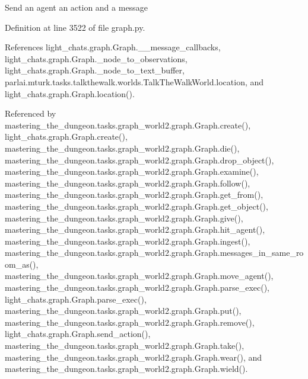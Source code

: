 \begin{DoxyVerb}Send an agent an action and a message\end{DoxyVerb}
 

Definition at line 3522 of file graph.\+py.



References light\+\_\+chats.\+graph.\+Graph.\+\_\+\+\_\+message\+\_\+callbacks, light\+\_\+chats.\+graph.\+Graph.\+\_\+node\+\_\+to\+\_\+observations, light\+\_\+chats.\+graph.\+Graph.\+\_\+node\+\_\+to\+\_\+text\+\_\+buffer, parlai.\+mturk.\+tasks.\+talkthewalk.\+worlds.\+Talk\+The\+Walk\+World.\+location, and light\+\_\+chats.\+graph.\+Graph.\+location().



Referenced by mastering\+\_\+the\+\_\+dungeon.\+tasks.\+graph\+\_\+world2.\+graph.\+Graph.\+create(), light\+\_\+chats.\+graph.\+Graph.\+create(), mastering\+\_\+the\+\_\+dungeon.\+tasks.\+graph\+\_\+world2.\+graph.\+Graph.\+die(), mastering\+\_\+the\+\_\+dungeon.\+tasks.\+graph\+\_\+world2.\+graph.\+Graph.\+drop\+\_\+object(), mastering\+\_\+the\+\_\+dungeon.\+tasks.\+graph\+\_\+world2.\+graph.\+Graph.\+examine(), mastering\+\_\+the\+\_\+dungeon.\+tasks.\+graph\+\_\+world2.\+graph.\+Graph.\+follow(), mastering\+\_\+the\+\_\+dungeon.\+tasks.\+graph\+\_\+world2.\+graph.\+Graph.\+get\+\_\+from(), mastering\+\_\+the\+\_\+dungeon.\+tasks.\+graph\+\_\+world2.\+graph.\+Graph.\+get\+\_\+object(), mastering\+\_\+the\+\_\+dungeon.\+tasks.\+graph\+\_\+world2.\+graph.\+Graph.\+give(), mastering\+\_\+the\+\_\+dungeon.\+tasks.\+graph\+\_\+world2.\+graph.\+Graph.\+hit\+\_\+agent(), mastering\+\_\+the\+\_\+dungeon.\+tasks.\+graph\+\_\+world2.\+graph.\+Graph.\+ingest(), mastering\+\_\+the\+\_\+dungeon.\+tasks.\+graph\+\_\+world2.\+graph.\+Graph.\+messages\+\_\+in\+\_\+same\+\_\+room\+\_\+as(), mastering\+\_\+the\+\_\+dungeon.\+tasks.\+graph\+\_\+world2.\+graph.\+Graph.\+move\+\_\+agent(), mastering\+\_\+the\+\_\+dungeon.\+tasks.\+graph\+\_\+world2.\+graph.\+Graph.\+parse\+\_\+exec(), light\+\_\+chats.\+graph.\+Graph.\+parse\+\_\+exec(), mastering\+\_\+the\+\_\+dungeon.\+tasks.\+graph\+\_\+world2.\+graph.\+Graph.\+put(), mastering\+\_\+the\+\_\+dungeon.\+tasks.\+graph\+\_\+world2.\+graph.\+Graph.\+remove(), light\+\_\+chats.\+graph.\+Graph.\+send\+\_\+action(), mastering\+\_\+the\+\_\+dungeon.\+tasks.\+graph\+\_\+world2.\+graph.\+Graph.\+take(), mastering\+\_\+the\+\_\+dungeon.\+tasks.\+graph\+\_\+world2.\+graph.\+Graph.\+wear(), and mastering\+\_\+the\+\_\+dungeon.\+tasks.\+graph\+\_\+world2.\+graph.\+Graph.\+wield().

